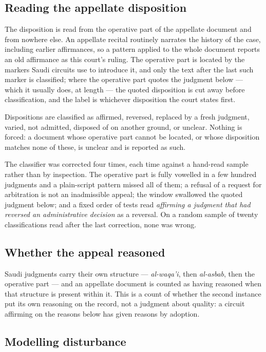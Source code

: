 \documentclass[11pt]{article}
\begin{document}
\subsection{Reading the appellate disposition}

The disposition is read from the operative part of the appellate document and
from nowhere else. An appellate recital routinely narrates the history of the
case, including earlier affirmances, so a pattern applied to the whole
document reports an old affirmance as this court's ruling. The operative part
is located by the markers Saudi circuits use to introduce it, and only the
text after the last such marker is classified; where the operative part
quotes the judgment below --- which it usually does, at length --- the quoted
disposition is cut away before classification, and the label is whichever
disposition the court states first.

Dispositions are classified as affirmed, reversed, replaced by a fresh
judgment, varied, not admitted, disposed of on another ground, or unclear.
Nothing is forced: a document whose operative part cannot be located, or
whose disposition matches none of these, is unclear and is reported as such.

The classifier was corrected four times, each time against a hand-read
sample rather than by inspection. The operative part is fully vowelled in a
few hundred judgments and a plain-script pattern missed all of them; a
refusal of a request for arbitration is not an inadmissible appeal; the
window swallowed the quoted judgment below; and a fixed order of tests read
\emph{affirming a judgment that had reversed an administrative decision} as
a reversal. On a random sample of twenty classifications read after the last
correction, none was wrong.

\subsection{Whether the appeal reasoned}

Saudi judgments carry their own structure --- \emph{al-waqa'i}, then
\emph{al-asbab}, then the operative part --- and an appellate document is
counted as having reasoned when that structure is present within it. This is
a count of whether the second instance put its own reasoning on the record,
not a judgment about quality: a circuit affirming on the reasons below has
given reasons by adoption.

\subsection{Modelling disturbance}
\end{document}
